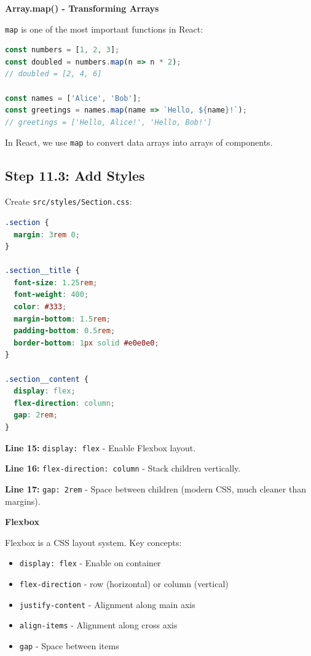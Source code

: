\documentclass[12pt,a4paper]{article}
\begin{document}
\begin{concept}
\textbf{Array.map() - Transforming Arrays}

\texttt{map} is one of the most important functions in React:

\begin{lstlisting}[language=JavaScript]
const numbers = [1, 2, 3];
const doubled = numbers.map(n => n * 2);
// doubled = [2, 4, 6]

const names = ['Alice', 'Bob'];
const greetings = names.map(name => `Hello, ${name}!`);
// greetings = ['Hello, Alice!', 'Hello, Bob!']
\end{lstlisting}

In React, we use \texttt{map} to convert data arrays into arrays of components.
\end{concept}

\subsection{Step 11.3: Add Styles}

Create \texttt{src/styles/Section.css}:

\begin{lstlisting}[language=CSS,caption={src/styles/Section.css}]
.section {
  margin: 3rem 0;
}

.section__title {
  font-size: 1.25rem;
  font-weight: 400;
  color: #333;
  margin-bottom: 1.5rem;
  padding-bottom: 0.5rem;
  border-bottom: 1px solid #e0e0e0;
}

.section__content {
  display: flex;
  flex-direction: column;
  gap: 2rem;
}
\end{lstlisting}

\begin{explanation}
\textbf{Line 15:} \texttt{display: flex} - Enable Flexbox layout.

\textbf{Line 16:} \texttt{flex-direction: column} - Stack children vertically.

\textbf{Line 17:} \texttt{gap: 2rem} - Space between children (modern CSS, much cleaner than margins).
\end{explanation}

\begin{concept}
\textbf{Flexbox}

Flexbox is a CSS layout system. Key concepts:
\begin{itemize}
    \item \texttt{display: flex} - Enable on container
    \item \texttt{flex-direction} - row (horizontal) or column (vertical)
    \item \texttt{justify-content} - Alignment along main axis
    \item \texttt{align-items} - Alignment along cross axis
    \item \texttt{gap} - Space between items
\end{itemize}
\end{concept}
\end{document}
